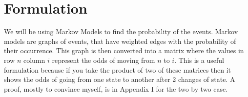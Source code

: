 \section{Formulation}
	
	We will be using Markov Models to find the probability of the events. 
Markov models are graphs of events, that have weighted edges with the probability of their occurrence. 
This graph is then converted into a matrix where the values in row $n$ column $i$ represent the odds of moving from $n$ to $i$. 
This is a useful formulation because if you take the product of two of these matrices then it shows the odds of going from one state to another after 2 changes of state. 
A proof, mostly to convince myself, is in Appendix I for the two by two case.

